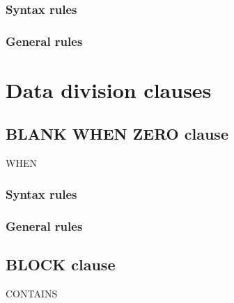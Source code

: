\begin{syntax}
\end{syntax}

\subsubsection{Syntax rules}

\subsubsection{General rules}

\section{Data division clauses}

\subsection{BLANK WHEN ZERO clause}
\begin{syntax}
   WHEN 
\end{syntax}

\subsubsection{Syntax rules}

\subsubsection{General rules}

\subsection{BLOCK clause}
\begin{syntax}
   CONTAINS \integer
  \begin{0-1}
     \integer
  \end{0-1}
  \begin{0-1}
     \\
  \end{0-1}\\
\end{syntax}

